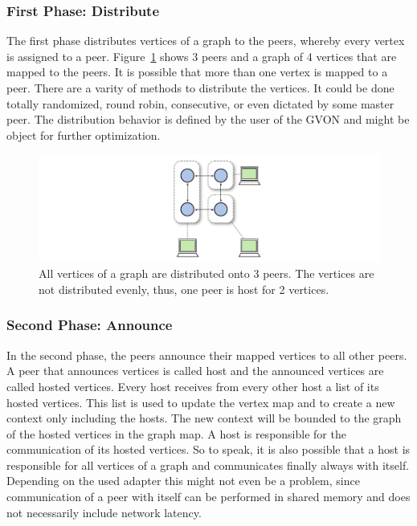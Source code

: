 \subsubsection*{First Phase: Distribute}
The first phase distributes vertices of a graph to the peers, whereby
every vertex is assigned to a peer.  Figure~\ref{fig:gvon_mapping}
shows 3 peers and a graph of 4 vertices that are mapped to the
peers. It is possible that more than one vertex is mapped to a peer.
There are a varity of methods to distribute the vertices.  It could be
done totally randomized, round robin, consecutive, or even dictated by
some master peer. The distribution behavior is defined by the user of
the GVON and might be object for further optimization.

\begin{figure}[H]
  \centering \includegraphics[width=\textwidth]{graphics/30_gvon_mapping}
  \caption{All vertices of a graph are distributed onto 3 peers. The
    vertices are not distributed evenly, thus, one peer is host for 2
    vertices.}
  \label{fig:gvon_mapping}
\end{figure}

\subsubsection*{Second Phase: Announce}
In the second phase, the peers announce their mapped vertices to all
other peers.  A peer that announces vertices is called host and the
announced vertices are called hosted vertices.  Every host receives
from every other host a list of its hosted vertices.  This list is
used to update the vertex map and to create a new context only
including the hosts. The new context will be bounded to the graph of
the hosted vertices in the graph map.  A host is responsible for the
communication of its hosted vertices.  So to speak, it is also
possible that a host is responsible for all vertices of a graph and
communicates finally always with itself.  Depending on the used
adapter this might not even be a problem, since communication of a
peer with itself can be performed in shared memory and does not
necessarily include network latency.


